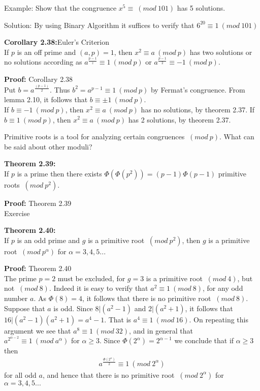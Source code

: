 \documentclass[a4paper]{article}
\begin{document}
Example: Show that the congruence $x^5 \equiv \ (mod\ 101)$ has 5 solutions.

Solution: By using Binary Algorithm it suffices to verify that $6^20 \equiv 1 \ (mod\ 101)$

\textbf{Corollary 2.38:}Euler's Criterion\\
If $p$ is an off prime and $(a,p)=1$, then $x^2 \equiv a \ (mod\ p)$ has two solutions or no solutions according as $a^\frac{p-1}{z} \equiv 1 \ (mod\ p)$ or $a^\frac{p-1}{2} \equiv -1 \ (mod\ p)$.

\textbf{Proof:} Corollary 2.38 \\
Put $b=a^{\frac{(p-1)}{2}}$. Thus $b^2=a^{p-1} \equiv 1 \ (mod\ p)$ by Fermat's congruence. From lemma 2.10, it follows that $b \equiv \pm 1 \ (mod\ p)$.\\
If $b \equiv -1 \ (mod\ p)$, then $x^2 \equiv a \ (mod\ p)$ has no solutions, by theorem 2.37.
If $b \equiv 1 \ (mod\ p)$, then $x^2 \equiv a \ (mod\ p)$ has 2 solutions, by theorem 2.37.

Primitive roots is a tool for analyzing certain congruences $\ (mod\ p)$. What can be said about other moduli?

\textbf{Theorem 2.39:}\\
If $p$ is a prime then there exists $\Phi(\Phi(p^2))=(p-1)\Phi(p-1)$ primitive roots $\ (mod\ p^2)$.

\textbf{Proof:} Theorem 2.39\\
Exercise

\textbf{Theorem 2.40:}\\
If $p$ is an odd prime and $g$ is a primitive root $\ (mod\ p^2)$, then $g$ is a primitive root $\ (mod\ p^{\alpha})$ for $\alpha = 3,4,5...$

\textbf{Proof:} Theorem 2.40\\
The prime $p=2$ must be excluded, for $g=3$ is a primitive root $\ (mod\ 4)$, but not $\ (mod\ 8)$. Indeed it is easy to verify that $a^2 \equiv 1 \ (mod\ 8)$, for any odd number $a$. As $\Phi(8)=4$, it follows that there is no primitive root $\ (mod\ 8)$.\\
Suppose that $a$ is odd. Since $8|(a^2-1)$ and $2|(a^2+1)$, it follows that $16|(a^2-1)(a^2+1)=a^4-1$. That is $a^4 \equiv 1 \ (mod\ 16)$. On repeating this argument we see that $a^8 \equiv 1 \ (mod\ 32)$, and in general that $a^2^{\alpha-2} \equiv 1 \ (mod\ a^{\alpha})$ for $\alpha \geq 3$. Since $\Phi(2^{\alpha})=2^{\alpha-1}$ we conclude that if $\alpha \geq 3$ then
\begin{align*}
     a^\frac{\Phi(2^{\alpha})}{2} \equiv 1 \ (mod\ 2^{\alpha})
\end{align*}
for all odd $a$, and hence that there is no primitive root $\ (mod\ 2^{\alpha})$ for $\alpha=3,4,5...$
\end{document}
